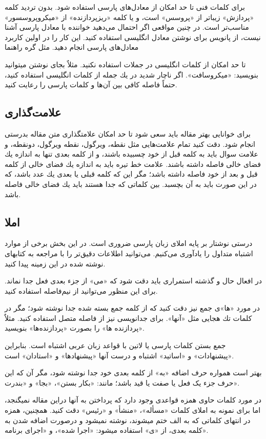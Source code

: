 \documentclass{CSICC}
\begin{document}
برای كلمات فنی تا حد امكان از معادل‌های پارسی استفاده شود. بدون تردید كلمه «پردازش» زیباتر از «پروسس» است، و یا كلمه «ریزپردازنده» از «میكروپروسسور» مناسب‌تر است. در چنین مواقعی اگر احتمال می‌دهید خواننده با معادل پارسی آشنا نیست، از پانویس برای نوشتن معادل انگلیسی استفاده كنید. این كار را در اولین كاربرد معادل‌های پارسی انجام دهید. مثل گره راهنما

تا حد امكان از كلمات انگلیسی در جملات استفاده نكنید. مثلاٌ بجای نوشتن  می­توانید بنویسید: «میكروسافت». اگر ناچار شدید در یك جمله از كلمات انگلیسی استفاده كنید، حتماً فاصله كافی بین آن‌ها و كلمات پارسی را رعایت كنید.

\subsection{علامت‌گذاری}
برای خوانایی بهتر مقاله باید سعی شود تا حد امكان علامت­گذاری متن مقاله بدرستی انجام شود. دقت كنید تمام علامت‌هایی مثل نقطه، ویرگول، نقطه ویرگول، دونقطه، و علامت سوال باید به كلمه قبل از خود چسبیده باشند، و از كلمه بعدی تنها به اندازه یك فضای خالی فاصله داشته باشند. علامت خط تیره باید به اندازه یك فضای خالی از كلمه قبل و بعد از خود فاصله داشته باشد؛ مگر این كه كلمه قبلی یا بعدی یك عدد باشد، كه در این صورت باید به آن بچسبد. بین كلماتی كه جدا هستند باید یك فضای خالی فاصله باشد.
\subsection{املا}
درستی نوشتار بر پایه املای زبان پارسی ضروری است. در این بخش برخی از موارد اشتباه متداول را یادآوری می‌كنیم. می‌توانید اطلاعات دقیق‌تر را با مراجعه به كتاب­های نوشته شده در این زمینه پیدا كنید.

در افعال حال و گذشته استمراری باید دقت شود كه «می» از جزء بعدی فعل جدا نماند. برای این منظور می‌توانید از نیم‌فاصله استفاده کنید.

در مورد «ها»ی جمع نیز دقت كنید كه از كلمه جمع بسته شده جدا نوشته شود؛ مگر در كلمات تك هجایی مثل «آنها». برای جدانویسی نیز از فاصله متصل استفاده كنید. مثلاٌ «پردازنده ها» را بصورت «پردازنده‌­ها» بنویسید.

جمع بستن كلمات پارسی یا لاتین با قواعد زبان عربی اشتباه است. بنابراین «پیشنهادات» و «اساتید» اشتباه و درست آنها «پیشنهادها» و «استادان» است.

بهتر است همواره حرف اضافه «به» از کلمه بعدی خود جدا نوشته شود، مگر آن که این حرف جزء یک فعل یا صفت یا قید باشد؛ مانند: «بکار بستن»، «بجا» و «بندرت».

در مورد کلمات حاوی همزه قواعدی وجود دارد که پرداختن به آنها دراین مقاله نمی­گنجد، اما برای نمونه به املای کلمات «مسأله»، «منشأ» و «رئیس» دقت كنید. همچنین، همزه در انتهای کلماتی که به الف ختم می­شوند، نوشته نمی­شود و درصورت اضافه شدن به کلمه بعدی، از «ی» استفاده می­شود: «اجرا شده»، و «اجرای برنامه».
\end{document}
